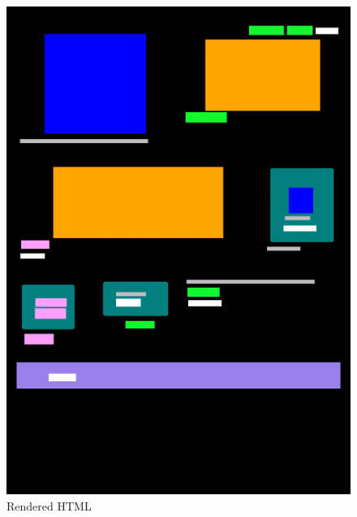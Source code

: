 \documentclass{ioereport}
\begin{document}
\begin{figure}[H]
    \centering
    \begin{minipage}{0.35\textwidth}
        \centering
        \includegraphics[width=\linewidth]{images/sample1-rendered.png}
        \caption{Rendered HTML}        
        \label{fig:s1}
    \end{minipage}\hfill
    \begin{minipage}{0.35\textwidth}
        \centering

\end{minipage}
\end{figure}
\end{document}
